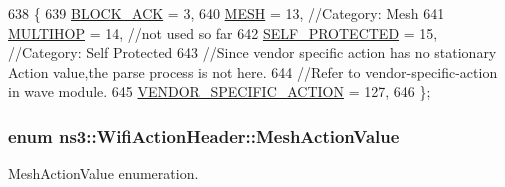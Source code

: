 \begin{DoxyCode}
638   \{
639     \hyperlink{classns3_1_1WifiActionHeader_a5402becd11b4077f22d76c4d0d923358ae1954449580715d3d737a12739923ef2}{BLOCK\_ACK} = 3,
640     \hyperlink{classns3_1_1WifiActionHeader_a5402becd11b4077f22d76c4d0d923358a2324e47740ec462176e2b3dbbf50fc59}{MESH} = 13,                  \textcolor{comment}{//Category: Mesh}
641     \hyperlink{classns3_1_1WifiActionHeader_a5402becd11b4077f22d76c4d0d923358a16a4194d2a8960fb5ec25ecd197cebf2}{MULTIHOP} = 14,              \textcolor{comment}{//not used so far}
642     \hyperlink{classns3_1_1WifiActionHeader_a5402becd11b4077f22d76c4d0d923358a0d41e6327b2a9ae590e3020f378e40e4}{SELF\_PROTECTED} = 15,        \textcolor{comment}{//Category: Self Protected}
643     \textcolor{comment}{//Since vendor specific action has no stationary Action value,the parse process is not here.}
644     \textcolor{comment}{//Refer to vendor-specific-action in wave module.}
645     \hyperlink{classns3_1_1WifiActionHeader_a5402becd11b4077f22d76c4d0d923358a5eb709c107cc95e2862f5a6a341c2fe7}{VENDOR\_SPECIFIC\_ACTION} = 127,
646   \};
\end{DoxyCode}
\subsubsection[{\texorpdfstring{Mesh\+Action\+Value}{MeshActionValue}}]{\setlength{\rightskip}{0pt plus 5cm}enum {\bf ns3\+::\+Wifi\+Action\+Header\+::\+Mesh\+Action\+Value}}\hypertarget{classns3_1_1WifiActionHeader_a7dec260ba924574c5abb38c1d8a562b1}{}\label{classns3_1_1WifiActionHeader_a7dec260ba924574c5abb38c1d8a562b1}


Mesh\+Action\+Value enumeration. 

